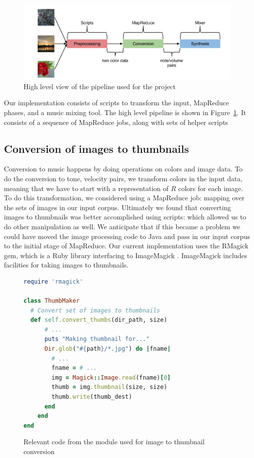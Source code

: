 \documentclass[10pt, conference, compsocconf]{IEEEtran}
\begin{document}
\begin{figure}
  \centering
  \includegraphics[width=.85\textwidth]{pipeline.png}
  \caption{High level view of the pipeline used for the project}
  \label{fig:project-pipeline}
\end{figure}

Our implementation consists of scripts to transform the input,
MapReduce phases, and a music mixing tool.  The high level pipeline is
shown in Figure~\ref{fig:project-pipeline}.  It consists of a sequence
of MapReduce jobs, along with sets of helper scripts 

\subsection{Conversion of images to thumbnails}

Conversion to music happens by doing operations on colors and image
data.  To do the conversion to tone, velocity pairs, we transform
colors in the input data, meaning that we have to start with a
representation of $R$ colors for each image.  To do this
transformation, we considered using a MapReduce job: mapping over the
sets of images in our input corpus.  Ultimately we found that
converting images to thumbnails was better accomplished using scripts:
which allowed us to do other manipulation as well.  We anticipate that
if this became a problem we could have moved the image processing code
to Java and pass in our input corpus to the initial stage of
MapReduce.  Our current implementation uses the RMagick \cite{rmagick}
gem, which is a Ruby library interfacing to ImageMagick
\cite{imagemagick}.  ImageMagick includes facilities for taking images
to thumbnails.

\begin{figure}
\begin{lstlisting}[language=Ruby]
require 'rmagick'

class ThumbMaker
  # Convert set of images to thumbnails
  def self.convert_thumbs(dir_path, size)
      # ... 
      puts "Making thumbnail for..."
      Dir.glob("#{path}/*.jpg") do |fname|
        # ...
        fname = # ...
        img = Magick::Image.read(fname)[0]
        thumb = img.thumbnail(size, size)
        thumb.write(thumb_dest)
      end
    end
end

\end{lstlisting}
\caption{Relevant code from the module used for image to thumbnail
  conversion}
\end{figure}
\end{document}
